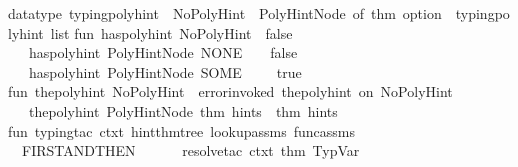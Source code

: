 \begin{isabellebody}
\isanewline
datatype\ typing{\isacharunderscore}{\kern0pt}poly{\isacharunderscore}{\kern0pt}hint\ {\isacharequal}{\kern0pt}\ NoPolyHint\ {\isacharbar}{\kern0pt}\ PolyHintNode\ of\ {\isacharparenleft}{\kern0pt}thm\ option\ {\isacharasterisk}{\kern0pt}\ {\isacharparenleft}{\kern0pt}typing{\isacharunderscore}{\kern0pt}poly{\isacharunderscore}{\kern0pt}hint\ list{\isacharparenright}{\kern0pt}{\isacharparenright}{\kern0pt}\isanewline
\isanewline
fun\ has{\isacharunderscore}{\kern0pt}poly{\isacharunderscore}{\kern0pt}hint\ NoPolyHint\ {\isacharequal}{\kern0pt}\ false\isanewline
\ {\isacharbar}{\kern0pt}\ \ has{\isacharunderscore}{\kern0pt}poly{\isacharunderscore}{\kern0pt}hint\ {\isacharparenleft}{\kern0pt}PolyHintNode\ {\isacharparenleft}{\kern0pt}NONE{\isacharcomma}{\kern0pt}\ {\isacharunderscore}{\kern0pt}\ {\isacharparenright}{\kern0pt}{\isacharparenright}{\kern0pt}\ {\isacharequal}{\kern0pt}\ false\isanewline
\ {\isacharbar}{\kern0pt}\ \ has{\isacharunderscore}{\kern0pt}poly{\isacharunderscore}{\kern0pt}hint\ {\isacharparenleft}{\kern0pt}PolyHintNode\ {\isacharparenleft}{\kern0pt}SOME\ {\isacharunderscore}{\kern0pt}{\isacharcomma}{\kern0pt}\ {\isacharunderscore}{\kern0pt}\ {\isacharparenright}{\kern0pt}{\isacharparenright}{\kern0pt}\ {\isacharequal}{\kern0pt}\ true\isanewline
\isanewline
fun\ the{\isacharunderscore}{\kern0pt}poly{\isacharunderscore}{\kern0pt}hint\ NoPolyHint\ {\isacharequal}{\kern0pt}\ error{\isacharparenleft}{\kern0pt}{\isachardoublequote}{\kern0pt}invoked\ the{\isacharunderscore}{\kern0pt}poly{\isacharunderscore}{\kern0pt}hint\ on\ NoPolyHint{\isachardoublequote}{\kern0pt}{\isacharparenright}{\kern0pt}\isanewline
\ \ {\isacharbar}{\kern0pt}\ the{\isacharunderscore}{\kern0pt}poly{\isacharunderscore}{\kern0pt}hint\ {\isacharparenleft}{\kern0pt}PolyHintNode\ {\isacharparenleft}{\kern0pt}thm{\isacharcomma}{\kern0pt}\ hints{\isacharparenright}{\kern0pt}{\isacharparenright}{\kern0pt}\ {\isacharequal}{\kern0pt}\ {\isacharparenleft}{\kern0pt}thm{\isacharcomma}{\kern0pt}\ hints{\isacharparenright}{\kern0pt}\isanewline
\isanewline
fun\ typing{\isacharunderscore}{\kern0pt}tac\ ctxt\ hint{\isacharunderscore}{\kern0pt}thm{\isacharunderscore}{\kern0pt}tree\ lookup{\isacharunderscore}{\kern0pt}assms\ func{\isacharunderscore}{\kern0pt}assms\ {\isacharequal}{\kern0pt}\ \ \isanewline
\ \ FIRST{\isacharunderscore}{\kern0pt}AND{\isacharunderscore}{\kern0pt}THEN{\isacharprime}{\kern0pt}\ \isanewline
\ \ \ \ {\isacharbrackleft}{\kern0pt}\ resolve{\isacharunderscore}{\kern0pt}tac\ ctxt\ {\isacharbrackleft}{\kern0pt}{\isacharat}{\kern0pt}{\isacharbraceleft}{\kern0pt}thm\ TypVar{\isacharbraceright}{\kern0pt}{\isacharbrackright}{\kern0pt}{\isacharcomma}{\kern0pt}\isanewline

\end{isabellebody}
